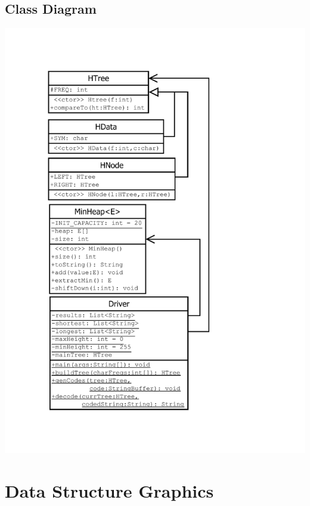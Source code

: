 	\subsection{Class Diagram}
	\begin{center}
		\includegraphics[scale=0.80]{3/cd.pdf}
	\end{center}
	\newpage
	\thispagestyle{empty}
	\begin{landscape}
		
	\end{landscape}

	
	\section{Data Structure Graphics}
